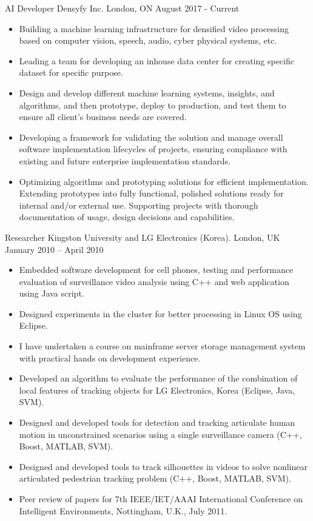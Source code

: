 \begin{cventries}
	\setlength{\itemsep}{1pt}
	\setlength{\parskip}{0pt}
	\setlength{\parsep}{0pt}
  \cventry
    {AI Developer}
    {Densyfy Inc.}
    {London, ON}
    {August 2017 - Current}
    {
	\begin{itemize}
		\item
		Building a machine learning infrastructure for densified video processing based on computer vision, speech, audio, cyber physical systems, etc.
		\item
		Leading a team for developing an inhouse data center for creating specific dataset for specific purpose.
		\item
		Design and develop different machine learning systems, insights, and algorithms, and then prototype, deploy to production, and test them to ensure all client’s business needs are covered.
		\item
		Developing a framework for validating the solution and manage overall software implementation lifecycles of projects, ensuring compliance with existing and future enterprise implementation standards.
		\item
		Optimizing algorithms and prototyping solutions for efficient implementation. Extending prototypes into fully functional, polished solutions ready for internal and/or external use. Supporting projects with thorough documentation of usage, design decisions and capabilities.		
	\end{itemize}
    }

  \cventry
    {Researcher}
    {Kingston University and LG Electronics (Korea). }
    {London, UK}
    {January 2010 – April 2010}
    {
    \begin{itemize}
    	\item
		Embedded software development for cell phones, testing and performance evaluation of surveillance video analysis using C++ and web application using Java script.
		\item
		Designed experiments in the cluster for better processing in Linux OS using Eclipse.
		\item
		I have undertaken a course on mainframe server storage management system with practical hands on development experience.
		\item
		Developed an algorithm to evaluate the performance of the combination of local features of tracking objects for LG Electronics, Korea (Eclipse, Java, SVM).
		\item
		Designed and developed tools for detection and tracking articulate human motion in unconstrained scenarios using a single surveillance camera (C++, Boost, MATLAB, SVM).
		\item
		Designed and developed tools to track silhouettes in videos to solve nonlinear articulated pedestrian tracking problem (C++, Boost, MATLAB, SVM).
		\item
		Peer review of papers for 7th IEEE/IET/AAAI International Conference on Intelligent Environments, Nottingham, U.K., July 2011.		
	\end{itemize}
    }
\end{cventries}
